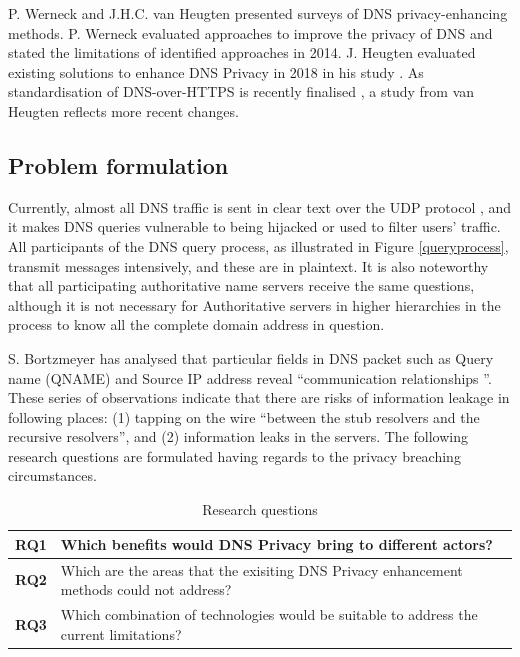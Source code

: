 \documentclass[a4paper,12pt]{article}
\begin{document}
P. Werneck and J.H.C. van Heugten presented surveys of DNS privacy-enhancing methods. P. Werneck evaluated approaches to improve the privacy of DNS and stated the limitations of identified approaches \cite{werneck2014dns} in 2014. J. Heugten evaluated existing solutions to enhance DNS Privacy in 2018 in his study \cite{van2018privacy}. As standardisation of DNS-over-HTTPS is recently finalised \cite{rfc8484}, a study from van Heugten reflects more recent changes.

\subsection{Problem formulation}\label{problemformulation}
Currently, almost all DNS traffic is sent in clear text \cite{rfc7626} over the UDP protocol \cite{tcp2014analysis}, and it makes DNS queries vulnerable to being hijacked or used to filter users' traffic.
All participants of the DNS query process, as illustrated in Figure \ref{queryprocess}, transmit messages intensively, and these are in plaintext.
It is also noteworthy that all participating authoritative name servers receive the same questions, although it is not necessary for Authoritative servers in higher hierarchies in the process to know all the complete domain address in question.

S. Bortzmeyer has analysed that particular fields in DNS packet \cite{rfc1035} such as Query name (QNAME) and Source IP address reveal ``communication relationships \cite{rfc7626}''.
These series of observations indicate that there are risks of information leakage in following places: (1) tapping on the wire ``between the stub resolvers and the recursive resolvers'', and (2) information leaks in the servers.
The following research questions are formulated having regards to the privacy breaching circumstances.

\begin{table}[h!]
    \begin{tabular} {|p{1.2cm}|p{12.8cm}|} \hline
        \textbf{RQ1} & Which benefits would DNS Privacy bring to different actors? \\ \hline
        \textbf{RQ2} & Which are the areas that the exisiting DNS Privacy enhancement methods could not address? \\ \hline
        \textbf{RQ3} & Which combination of technologies would be suitable to address the current limitations?\\ \hline
    \end{tabular}
    \caption{Research questions}
\label{researchquestions}
\end{table}
\end{document}
